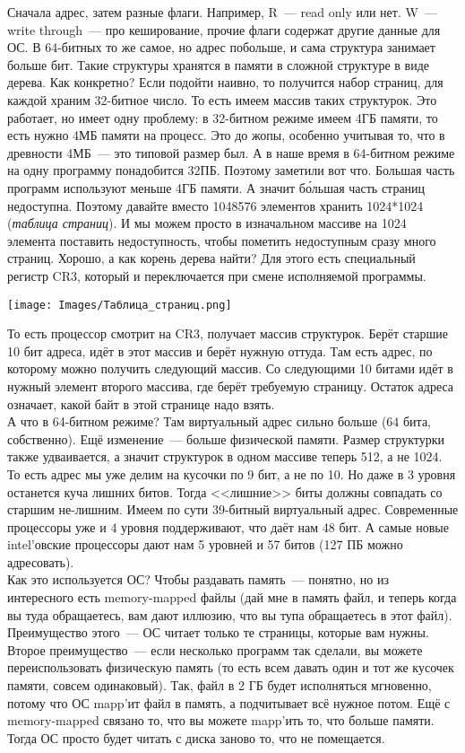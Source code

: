 \documentclass{article}
\begin{document}
    Сначала адрес, затем разные флаги. Например, R~--- read only или нет. W~--- write through~--- про кеширование, прочие флаги содержат другие данные для ОС. В 64-битных то же самое, но адрес побольше, и сама структура занимает больше бит. Такие структуры хранятся в памяти в сложной структуре в виде дерева. Как конкретно? Если подойти наивно, то получится набор страниц, для каждой храним 32-битное число. То есть имеем массив таких структурок. Это работает, но имеет одну проблему: в 32-битном режиме имеем 4ГБ памяти, то есть нужно 4МБ памяти на процесс. Это до жопы, особенно учитывая то, что в древности 4МБ~--- это типовой размер был. А в наше время в 64-битном режиме на одну программу понадобится 32ПБ. Поэтому заметили вот что. Большая часть программ используют меньше 4ГБ памяти. А значит б\'{о}льшая часть страниц недоступна. Поэтому давайте вместо 1048576 элементов хранить 1024*1024 (\textit{таблица страниц}). И мы можем просто в изначальном массиве на 1024 элемента поставить недоступность, чтобы пометить недоступным сразу много страниц. Хорошо, а как корень дерева найти? Для этого есть специальный регистр CR3, который и переключается при смене исполняемой программы.
    \begin{center}
        \texttt{[image: Images/Таблица\_страниц.png]}
    \end{center}
    То есть процессор смотрит на CR3, получает массив структурок. Берёт старшие 10 бит адреса, идёт в этот массив и берёт нужную оттуда. Там есть адрес, по которому можно получить следующий массив. Со следующими 10 битами идёт в нужный элемент второго массива, где берёт требуемую страницу. Остаток адреса означает, какой байт в этой странице надо взять.\\
    А что в 64-битном режиме? Там виртуальный адрес сильно больше (64 бита, собственно). Ещё изменение~--- больше физической памяти. Размер структурки также удваивается, а значит структурок в одном массиве теперь 512, а не 1024. То есть адрес мы уже делим на кусочки по 9 бит, а не по 10. Но даже в 3 уровня останется куча лишних битов. Тогда <<лишние>> биты должны совпадать со старшим не-лишним. Имеем по сути 39-битный виртуальный адрес. Современные процессоры уже и 4 уровня поддерживают, что даёт нам 48 бит. А самые новые intel'овские процессоры дают нам 5 уровней и 57 битов (127 ПБ можно адресовать).\\
    Как это используется ОС? Чтобы раздавать память~--- понятно, но из интересного есть memory-mapped файлы (дай мне в память файл, и теперь когда вы туда обращаетесь, вам дают иллюзию, что вы тупа обращаетесь в этот файл). Преимущество этого~--- ОС читает только те страницы, которые вам нужны. Второе преимущество~--- если несколько программ так сделали, вы можете переиспользовать физическую память (то есть всем давать один и тот же кусочек памяти, совсем одинаковый). Так, файл в 2 ГБ будет исполняться мгновенно, потому что ОС mapp'ит файл в память, а подчитывает всё нужное потом. Ещё с memory-mapped связано то, что вы можете mapp'ить то, что больше памяти. Тогда ОС просто будет читать с диска заново то, что не помещается.\\
\end{document}
